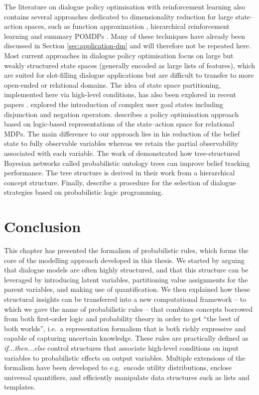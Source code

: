 The literature on dialogue policy optimisation with reinforcement learning also contains several approaches dedicated to dimensionality reduction for large state--action spaces, such as function approximation \citep{Henderson:2008}, hierarchical reinforcement learning \citep{Cuayahuitl:2010} and summary POMDPs \citep{Young:2010}.  Many of these techniques have already been discussed in Section \ref{sec:application-dm} and will therefore not be repeated here. Most current approaches in dialogue policy optimisation focus on large but weakly structured state spaces (generally encoded as large lists of features), which are suited for slot-filling dialogue applications but are difficult to transfer to more open-ended or relational domains.  The idea of state space partitioning, implemented here via high-level conditions, has also been explored in recent papers \citep[see e.g.\ ][]{Williams2010}. \cite{Crook:2010} explored the introduction of complex user goal states including disjunction and negation operators. \cite{Heriberto2011} describes a policy optimisation approach based on logic-based representations of the state--action space for relational MDPs. The main difference to our approach lies in his reduction of the belief state to fully observable variables whereas we retain the partial observability associated with each variable.  The work of \cite{Mehta:2010,Raux2011} demonstrated how tree-structured Bayesian networks called probabilistic ontology trees can improve belief tracking performance.  The tree structure is derived in their work from a hierarchical concept structure.  Finally, \cite{neill2011} describe a procedure for the selection of dialogue strategies based on probabilistic logic programming. 

\section{Conclusion}

This chapter has presented the formalism of probabilistic rules, which forms the core of the modelling approach developed in this thesis. We started by arguing that dialogue models are often highly structured, and that this structure can be leveraged by introducing latent variables, partitioning value assignments for the parent variables, and making use of quantification. We then explained how these structural insights can be transferred into a new computational framework -- to which we gave the name of probabilistic rules -- that combines concepts borrowed from both first-order logic and probability theory in order to get ``the best of both worlds'', i.e.\ a representation formalism that is both richly expressive and capable of capturing uncertain knowledge.  These rules are practically defined as \textit{if...then...else} control structures that associate high-level conditions on input variables to probabilistic effects on output variables.  Multiple extensions of the formalism have been developed to e.g.\ encode utility distributions, enclose universal quantifiers, and efficiently manipulate data structures such as lists and templates. 

